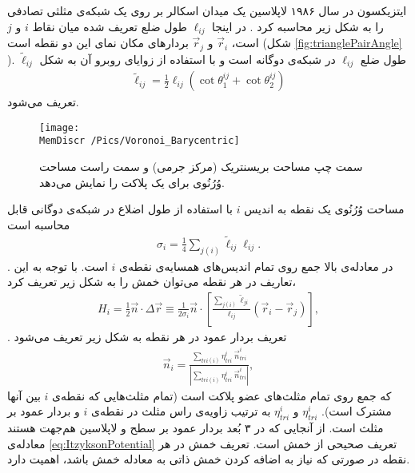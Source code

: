 ایتزیکسون
در سال ۱۹۸۶ لاپلاسین یک میدان اسکالر بر روی یک شبکه‌ی مثلثی تصادفی را به شکل زیر محاسبه کرد
\cite{Itzykson1986}
. در اینجا 
$\ell_{ij}$
طول ضلع تعریف شده میان نقاط 
$i$
و
$j$
است، 
$\vec r_i$
و
$\vec r_j$
بردار‌های مکان نمای این دو نقطه‌ است (شکل
\ref{fig:trianglePairAngle}
). 
$\tilde\ell_{ij}$
طول ضلع 
$\ell_{ij}$
در شبکه‌ی دوگانه‌ 
است و با استفاده از زوایا‌ی روبرو آن به شکل 
\begin{eqnarray}
\tilde\ell_{ij}=\frac{1}{2}\ell_{ij}(\cot\theta_1^{ij}+\cot\theta_2^{ij})
\label{eq:dualLattice}
\end{eqnarray}
تعریف می‌شود.

\begin{figure}[htbp]
\begin{center}
\texttt{[image: \\MemDiscr /Pics/Voronoi\_Barycentric]}

\caption{
سمت چپ مساحت بریسنتریک (مرکز جرمی) و سمت راست مساحت وُرُنُوی برای یک پلاکت را نمایش می‌دهد.
}
\label{fig:voronoiBarycentric}
\end{center}
\end{figure}
مساحت وُرُنُوی
یک نقطه به اندیس 
$i$
با استفاده از طول اضلاع در شبکه‌ی دوگانی قابل محاسبه است
\begin{eqnarray}
\sigma_i=\frac{1}{4}\sum_{j(i)}\tilde\ell_{ij}\ell_{ij}.
\label{eq:voronoiArea}
\end{eqnarray}
. در معادله‌ی بالا جمع روی تمام اندیس‌های همسایه‌ی نقطه‌ی 
$i$
است. با توجه به این تعاریف در هر نقطه می‌توان خمش را به شکل زیر تعریف کرد،
\begin{eqnarray}
H_i=\frac{1}{2}\vec n\cdot\Delta \vec r\equiv\frac{1}{2\sigma_i}\vec n \cdot\left[\frac{\sum_{j(i)}\tilde\ell_{ji}}{\ell_{ij}}(\vec r_i-\vec r_j)\right],
\label{eq:meanCurvatureDiscreteSingleVertex}
\end{eqnarray}
. تعریف بردار عمود در هر نقطه به شکل زیر تعریف می‌شود
\cite{Thurrner1998NormalVec}
\begin{eqnarray}
\vec n_i=\frac{\sum_{tri(i)} \eta_{tri}^i~\vec n_{tri}^i}{|\sum_{tri(i)} \eta_{tri}^i~\vec n_{tri}^i|},
\label{eq:noramlVector}
\end{eqnarray}
که جمع روی تمام مثلث‌های عضو پلاکت
است (تمام مثلث‌هایی که نقطه‌ی 
$i$
بین آنها مشترک است). 
$\eta_{tri}^i$
و
$\eta_{tri}^i$
به ترتیب زاویه‌ی راس مثلث در نقطه‌ی 
$i$
و بردار عمود بر مثلث است. از آنجایی که در ۳ بُعد بردار عمود بر سطح و لاپلاسین هم‌جهت هستند
\cite{Gompper1996}
معادله‌ی 
\ref{eq:ItzyksonPotential}
تعریف صحیحی از خمش است. تعریف خمش در هر نقطه در صورتی که نیاز به  اضافه کردن خمش ذاتی به معادله خمش باشد، اهمیت دارد. 

